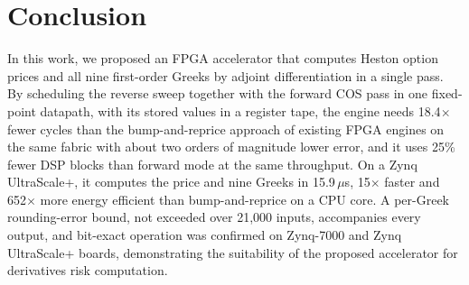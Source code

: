 \documentclass[conference]{IEEEtran}
\begin{document}
\section{Conclusion}
In this work, we proposed an FPGA accelerator that computes Heston option prices and all nine
first-order Greeks by adjoint differentiation in a single pass. By scheduling the reverse sweep
together with the forward COS pass in one fixed-point datapath, with its stored values in a
register tape, the engine needs 18.4$\times$ fewer cycles than the bump-and-reprice approach of
existing FPGA engines on the same fabric with about two orders of magnitude lower error, and it uses 25\%
fewer DSP blocks than forward mode at the same throughput. On a Zynq UltraScale+, it computes the
price and nine Greeks in 15.9\,$\mu$s, 15$\times$ faster and 652$\times$ more energy efficient than
bump-and-reprice on a CPU core. A per-Greek rounding-error bound, not exceeded over 21,000 inputs,
accompanies every output, and bit-exact operation was confirmed on Zynq-7000 and Zynq UltraScale+
boards, demonstrating the suitability of the proposed accelerator for derivatives risk
computation.
\end{document}
